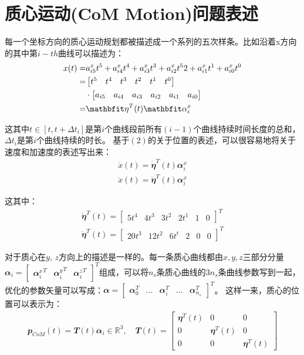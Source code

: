 \section{质心运动(CoM Motion)问题表述}
每一个坐标方向的质心运动规划都被描述成一个系列的五次样条。比如沿着x方向的其中第$i-th$曲线可以描述为：
\begin{align}
    x(t) = & a_{i5}^x t^5 +  a_{i4}^x t^4 + a_{i3}^x t^3 +  a_{i2}^x t^52+  a_{i1}^x t^1 +  a_{i0}^x t^0 \notag\\
    = & \begin{bmatrix}t^5 & t^4 & t^3 & t^2 & t^1 & t^0\end{bmatrix} \notag\\ 
    & \cdot \begin{bmatrix}a_{i5} & a_{i4} & a_{i3} & a_{i2} & a_{i1} & a_{i0}\end{bmatrix} \notag\\
    = & {\mathbfit \eta}^T(t){\mathbfit \alpha}_i^x
\end{align}

 
这其中$t\in [t, t+\Delta t_i]$是第$i$个曲线段前所有$(i-1)$个曲线持续时间长度的总和，$\Delta t_i$是第$i$个曲线持续的时长。
基于$(2)$的关于位置的表述，可以很容易地将关于速度和加速度的表述写出来：
\begin{align}
\dot x(t) = \dot {\mathbfit \eta}^T(t){\mathbfit \alpha}_i^x \\
\ddot x(t) = \ddot {\mathbfit \eta}^T(t) {\mathbfit \alpha}_i^x 
\end{align}

这其中：
\begin{align}
\dot {\mathbfit \eta}^T(t) =  \begin{bmatrix}5t^4 & 4t^3 & 3t^2 & 2t^1 & 1 & 0\end{bmatrix}^T\\
\ddot {\mathbfit \eta}^T(t) =  \begin{bmatrix}20t^3 & 12t^2 & 6t^t & 2 & 0 & 0\end{bmatrix}^T
\end{align}

对于质心在$y,\, z$方向上的描述是一样的。每一条质心曲线都由$x,y,z$三部分分量${\mathbfit \alpha}_i = \begin{bmatrix}{{\mathbfit \alpha}_i^x}^T & {{\mathbfit \alpha}_i^y}^T & {{\mathbfit \alpha}_i^z}^T\end{bmatrix}^T$组成，可以将$n_s$条质心曲线的$3n_s$条曲线参数写到一起，优化的参数矢量可以写成：${\mathbfit \alpha} = \begin{bmatrix}{\mathbfit \alpha}_0^T & ...& {\mathbfit \alpha}_i^T &...& {\mathbfit \alpha}_{n_s}^T\end{bmatrix}^T$。
这样一来，质心的位置可以表示为：
\begin{align}
    {\mathbfit p}_{CoM}(t) = {\mathbfit T}(t){\mathbfit \alpha}_i \in{\mathbb R}^3
    , \quad
    {\mathbfit T}(t) = 
    \begin{bmatrix}
    {\mathbfit \eta}^T(t) & 0 & 0 \\
    0 & {\mathbfit \eta}^T(t) & 0 \\
    0 & 0 & {\mathbfit \eta}^T(t)
    \end{bmatrix}
\end{align}

